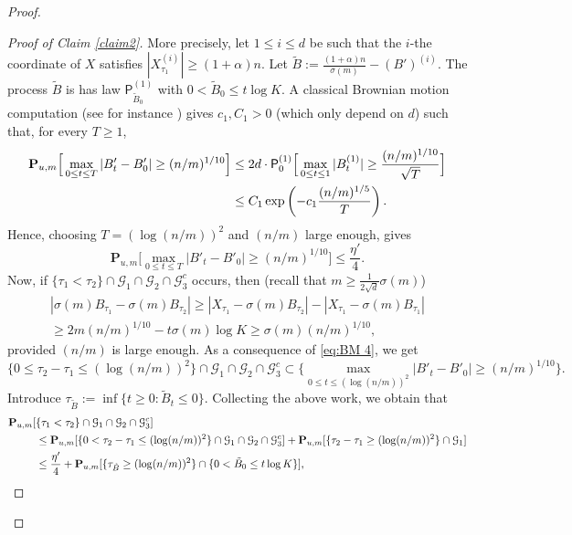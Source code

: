 \documentclass[11pt,a4paper]{article}
\numberwithin{equation}{section}
\theoremstyle{plain}
\theoremstyle{definition}
\begin{document}
\begin{proof}
\begin{proof}[Proof of Claim \textup{\ref{claim2}}]
 More precisely, let $1\leq i \leq d$ be such that the $i$-the coordinate of $X$ satisfies $|X_{\tau_1}^{(i)}|\geq (1+\alpha)n$. Let $\tilde B:=\tfrac{(1+\alpha)n}{\sigma(m)}-(B')^{(i)}$. The process $\tilde B$ is has law $\mathsf P^{(1)}_{\tilde B_0}$ with $0<\tilde B_0\leq t\log K$. A classical Brownian motion computation (see for instance \cite[Chapter~2.8]{karatzas1991brownian}) gives $c_1,C_1>0$ (which only depend on $d$) such that, for every $T\geq 1$,
 \begin{align}\notag
 	\mathbf P_{u,m}\Big[\max_{0\leq t \leq T} |B'_{t}-B'_0|\geq (n/m)^{1/10}\Big]&\leq 2d\cdot\mathsf P_{0}^{(1)}\Big[\max_{0\leq t \leq 1} |B_{t}^{(1)}|
 	\geq \frac{(n/m)^{1/10}}{\sqrt{T}}\Big]\\&\leq C_1\exp\left(-c_1\frac{(n/m)^{1/5}}{T}\right).
 \end{align}
 Hence, choosing $T=(\log (n/m))^2$ and $(n/m)$ large enough, gives
 \begin{equation}\label{eq:BM 3}
 	\mathbf P_{u,m}\Big[\max_{0\leq t \leq T} |B'_{t}-B'_0|\geq (n/m)^{1/10}\Big]\leq \frac{\eta'}{4}.
 \end{equation}
 Now, if $\{\tau_1<\tau_2\}\cap\mathcal G_1\cap \mathcal G_2\cap \mathcal G_3^c$ occurs, then (recall that $m\geq \tfrac{1}{2\sqrt{d}}\sigma(m)$) 
 \begin{multline}\label{eq:BM 4}
 |\sigma(m)B_{\tau_1}-\sigma(m)B_{\tau_2}|\geq |X_{\tau_1}-\sigma(m)B_{\tau_2}|-|X_{\tau_1}-\sigma(m)B_{\tau_1}|\\\geq 2m(n/m)^{1/10}- t\sigma(m)\log K\geq \sigma(m)(n/m)^{1/10},
 \end{multline}
 provided $(n/m)$ is large enough.
As a consequence of \eqref{eq:BM 4}, we get 
 \begin{equation}\label{eq:BM 5}
 	\{0\leq \tau_2-\tau_1\leq (\log (n/m))^2\}\cap \mathcal G_1\cap \mathcal G_2\cap \mathcal G_3^c\subset \Big\{\max_{0\leq t \leq (\log(n/m))^2} |B'_{t}-B'_0|\geq (n/m)^{1/10}\Big\}.
 \end{equation}
 Introduce $\tau_{\tilde B}:=\inf\{t\geq 0: \tilde B_t\leq 0\}$. Collecting the above work, we obtain that \begin{align}\notag
 	\mathbf P_{u,m}[&\{\tau_1<\tau_2\}\cap \mathcal G_1\cap \mathcal G_2\cap \mathcal G_3^c]\\&\leq \mathbf P_{u,m}[\{0<\tau_2-\tau_1\leq (\log (n/m))^2\}\cap \mathcal G_1\cap \mathcal G_2\cap \mathcal G_3^c]+\mathbf P_{u,m}[\{\tau_2-\tau_1\geq (\log (n/m))^2\}\cap \mathcal G_1]\notag\\&\leq \frac{\eta'}{4}+\mathbf P_{u,m}[ \{\tau_{\tilde B} \geq (\log (n/m))^2\}\cap \{0<\tilde B_0\leq t\log K\}]\label{eq:BM 6},

\end{align}
\end{proof}
\end{proof}
\end{document}
